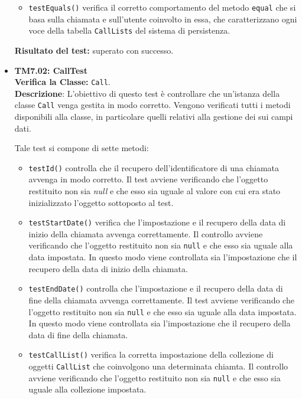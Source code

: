 \begin{itemize}
\begin{itemize}
\item \texttt{testEquals()} verifica il corretto comportamento del metodo \texttt{equal} che si basa sulla chiamata e sull'utente coinvolto in essa, che caratterizzano ogni voce della tabella \texttt{CallLists} del sistema di persistenza. 

 
\end{itemize}
\textbf{Risultato del test:} superato con successo.

\item \textbf{TM7.02: CallTest}\\
\textbf{Verifica la Classe:} \texttt{Call}.\\
\textbf{Descrizione}: L'obiettivo di questo test è controllare che un'istanza della classe  \texttt{Call} venga gestita in modo corretto. Vengono verificati tutti i metodi disponibili alla classe, in particolare quelli relativi alla gestione dei sui campi dati.

Tale test si compone di sette metodi:
\begin{itemize}

\item \texttt{testId()} controlla che il recupero dell'identificatore di una chiamata avvenga in modo corretto. 
Il test avviene verificando che l'oggetto restituito non sia \textit{null} e che esso sia uguale al valore con cui era stato inizializzato l'oggetto sottoposto al test.

\item \texttt{testStartDate()} verifica che l'impostazione e il recupero della data di inizio della chiamata avvenga correttamente.
Il controllo avviene verificando che l'oggetto restituito non sia \texttt{null} e che esso sia uguale alla data impostata. In questo modo viene controllata sia l'impostazione che il recupero della data di inizio della chiamata.

\item \texttt{testEndDate()} controlla che l'impostazione e il recupero della data di fine della chiamata avvenga correttamente.
Il test avviene verificando che l'oggetto restituito non sia \texttt{null} e che esso sia uguale alla data impostata. In questo modo viene controllata sia l'impostazione che il recupero della data di fine della chiamata.

\item \texttt{testCallList()} verifica la corretta impostazione  della collezione di oggetti \texttt{CallList} che coinvolgono una determinata chiamta. 
Il controllo avviene verificando che l'oggetto restituito non sia \texttt{null} e che esso sia uguale alla collezione impostata.


\end{itemize}
\end{itemize}
